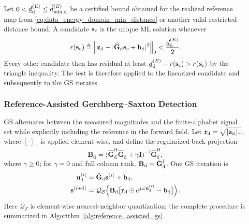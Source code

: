 \documentclass[journal]{IEEEtran}
\begin{document}
Let $0<\underline d_{\rm d}^{(E)}\leq\widehat d_{\min,{\rm d}}^{(E)}$ be a
certified bound obtained for the realized reference map from
\eqref{eq:data_energy_domain_min_distance} or another valid restricted-distance
bound. A candidate
$\mathbf s_{\rm c}$ is the unique ML solution whenever
\begin{equation}
r(\mathbf s_{\rm c})\triangleq
\left\|\mathbf z_{\rm d}-
|\widehat{\mathbf G}_{\rm d}\mathbf s_{\rm c}+\mathbf b_{\rm d}|^2
\right\|_2
<\frac{\underline d_{\rm d}^{(E)}}{2}.
\label{eq:distance_certified_ml_test}
\end{equation}
Every other candidate then has residual at least
$\underline d_{\rm d}^{(E)}-r(\mathbf s_{\rm c})>r(\mathbf s_{\rm c})$ by the
triangle inequality.  The test is therefore applied to the linearized candidate
and subsequently to the GS iterates.

\subsubsection{Reference-Assisted Gerchberg--Saxton Detection}

GS alternates between the measured magnitudes and the finite-alphabet signal
set while explicitly including the reference in the forward field. Let
$\mathbf r_{\rm d}=\sqrt{[\mathbf z_{\rm d}]_+}$, where $[\cdot]_+$ is applied
element-wise, and define the regularized back-projection
\begin{equation}
\mathbf{B}_{\mathrm{d}}
=
\bigl(
\hat{\mathbf{G}}_{\mathrm{d}}^{\mathsf{H}}
\hat{\mathbf{G}}_{\mathrm{d}}
+
\gamma\mathbf{I}
\bigr)^{-1}
\hat{\mathbf{G}}_{\mathrm{d}}^{\mathsf{H}},
\label{eq:regularized_back_projection}
\end{equation}
where $\gamma\geq0$; for $\gamma=0$ and full column rank,
$\mathbf B_{\rm d}=\hat{\mathbf G}_{\rm d}^{\dagger}$. One GS iteration is
\begin{equation}
\begin{aligned}
\mathbf u_{\rm d}^{(i)}&=\hat{\mathbf G}_{\rm d}\mathbf s^{(i)}+\mathbf b_{\rm d},\\
\mathbf s^{(i+1)}&=\mathcal Q_{\mathcal S}\!\left(
\mathbf B_{\rm d}\bigl[\mathbf r_{\rm d}\odot
e^{j\angle\mathbf u_{\rm d}^{(i)}}-\mathbf b_{\rm d}\bigr]\right).
\end{aligned}
\label{eq:reference_assisted_gs_update}
\end{equation}
Here $\mathcal Q_{\mathcal S}$ is element-wise nearest-neighbor quantization;
the complete procedure is summarized in Algorithm~\ref{alg:reference_assisted_gs}.
\end{document}

